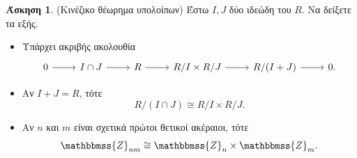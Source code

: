 \documentclass[12pt,a4paper,reqno]{amsart}
\theoremstyle{definition}
\newtheorem{exercise}{Άσκηση}
\newcommand{\ZZ}{\mathbbmss{Z}}
\begin{document}
\begin{exercise}{\rm(Κινέζικο θέωρημα υπολοίπων)}
  \label{ex:chinese_remainder_thm}
  Έστω $I, J$ δύο ιδεώδη του $R$. Να δείξετε τα εξής.
  \begin{itemize}
    \item[(α)] Υπάρχει ακριβής ακολουθία 
    \[
    \begin{tikzcd}
        0 \arrow[r] & I \cap J \arrow[r] & R \arrow[r] & R/I \times R/J \arrow[r] & R/(I+J) \arrow[r] & 0.
    \end{tikzcd}
    \]
    \item[(β)] Αν $I + J = R$, τότε 
    \[
    R/(I\cap J) \cong R/I \times R/J.
    \]
    \item[(γ)] Αν $n$ και $m$ είναι σχετικά πρώτοι θετικοί ακέραιοι, τότε 
    \[
    \ZZ_{nm} \cong \ZZ_n \times \ZZ_m.
    \]
  \end{itemize}
\end{exercise}
\end{document}
